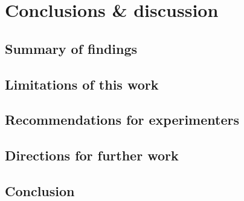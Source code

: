 
\chapter{Conclusions \& discussion}

\section{Summary of findings}




\begin{figure}
\label{fig:PR-and-latency-conclusion}
\end{figure}






\section{Limitations of this work}

\section{Recommendations for experimenters}

\section{Directions for further work}

\section{Conclusion}
